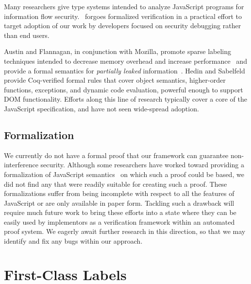 Many researchers give type systems intended to analyze JavaScript programs for information flow security.
\JitFlow\ forgoes formalized verification in a practical effort to target adoption of our work by developers focused on security debugging rather than end users.

Austin and Flannagan, in conjunction with Mozilla, promote sparse labeling techniques intended to decrease memory overhead and increase performance~\cite{austin.flanagan+09} and provide a formal semantics for \emph{partially leaked} information~\cite{austin.flanagan+10}.
Hedin and Sabelfeld~\cite{hedin.sabelfeld+12} provide Coq-verified formal rules that cover object semantics, higher-order functions, exceptions, and dynamic code evaluation, powerful enough to support DOM functionality.
Efforts along this line of research typically cover a core of the JavaScript specification, and have not seen wide-spread adoption.

\subsection{Formalization}

We currently do not have a formal proof that our framework can guarantee non-interference security.
Although some researchers have worked toward providing a formalization of JavaScript semantics~\cite{yu.etal+07, herman.flanagan+07, maffeis.etal+08, guha.etal+10} on which such a proof could be based, we did not find any that were readily suitable for creating such a proof.
These formalizations suffer from being incomplete with respect to all the features of JavaScript or are only available in paper form.
Tackling such a drawback will require much future work to bring these efforts into a state where they can be easily used by implementors as a verification framework within an automated proof system.
We eagerly await further research in this direction, so that we may identify and fix any bugs within our approach.

\section{First-Class Labels}

